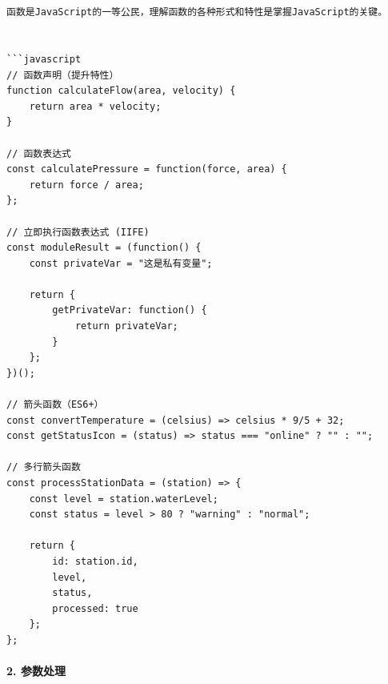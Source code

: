 \begin{verbatim}


函数是JavaScript的一等公民，理解函数的各种形式和特性是掌握JavaScript的关键。


```javascript
// 函数声明（提升特性）
function calculateFlow(area, velocity) {
    return area * velocity;
}

// 函数表达式
const calculatePressure = function(force, area) {
    return force / area;
};

// 立即执行函数表达式 (IIFE)
const moduleResult = (function() {
    const privateVar = "这是私有变量";
    
    return {
        getPrivateVar: function() {
            return privateVar;
        }
    };
})();

// 箭头函数（ES6+）
const convertTemperature = (celsius) => celsius * 9/5 + 32;
const getStatusIcon = (status) => status === "online" ? "" : "";

// 多行箭头函数
const processStationData = (station) => {
    const level = station.waterLevel;
    const status = level > 80 ? "warning" : "normal";
    
    return {
        id: station.id,
        level,
        status,
        processed: true
    };
};
\end{verbatim}

\paragraph{2. 参数处理}\label{ux53c2ux6570ux5904ux7406}

